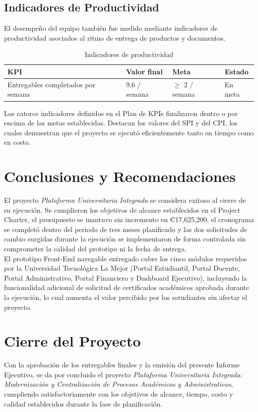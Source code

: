 \documentclass[11pt,spanish]{article}
\begin{document}
\subsection{Indicadores de Productividad}

El desempeño del equipo también fue medido mediante indicadores de
productividad asociados al ritmo de entrega de productos y documentos.

\begin{table}[H]
\centering
\caption{Indicadores de productividad}
\label{tab:kpi-productividad}
\begin{tabularx}{\textwidth}{Yp{3cm}p{2.5cm}p{2.5cm}}
\toprule
\textbf{KPI} &
\textbf{Valor final} &
\textbf{Meta} &
\textbf{Estado} \\
\midrule

Entregables completados por semana &
9.6 / semana &
$\geq$ 2 / semana &
En meta
\\

\bottomrule
\end{tabularx}
\end{table}

Los catorce indicadores definidos en el Plan de KPIs finalizaron dentro o por
encima de las metas establecidas. Destacan los valores del SPI y del CPI,
los cuales demuestran que el proyecto se ejecutó eficientemente tanto en
tiempo como en costo.

\section{Conclusiones y Recomendaciones}

El proyecto \textit{Plataforma Universitaria Integrada} se considera exitoso al cierre de su ejecución. Se cumplieron los objetivos de alcance establecidos en el Project Charter, el presupuesto se mantuvo sin incremento en ₡17,625,200, el cronograma se completó dentro del periodo de tres meses planificado y las dos solicitudes de cambio surgidas durante la ejecución se implementaron de forma controlada sin comprometer la calidad del prototipo ni la fecha de entrega.\\
El prototipo Front-End navegable entregado cubre los cinco módulos requeridos por la Universidad Tecnológica La Mejor (Portal Estudiantil, Portal Docente, Portal Administrativo, Portal Financiero y Dashboard Ejecutivo), incluyendo la funcionalidad adicional de solicitud de certificados académicos aprobada durante la ejecución, lo cual aumenta el valor percibido por los estudiantes sin afectar el proyecto.


\section{Cierre del Proyecto}

Con la aprobación de los entregables finales y la emisión del presente
Informe Ejecutivo, se da por concluido el proyecto \textit{Plataforma
Universitaria Integrada: Modernización y Centralización de Procesos
Académicos y Administrativos}, cumpliendo satisfactoriamente con los
objetivos de alcance, tiempo, costo y calidad establecidos durante la fase
de planificación.
\end{document}
